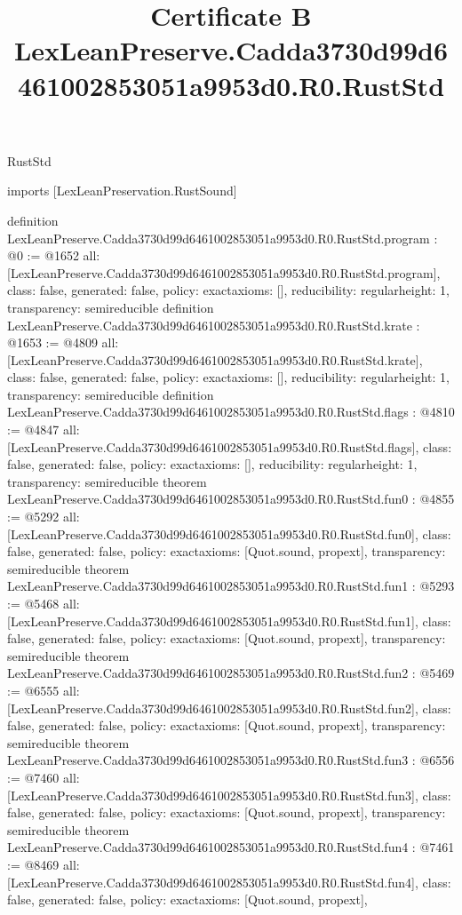 \begin{lexlean}{RustStd}
\title{Certificate B LexLeanPreserve.Cadda3730d99d6461002853051a9953d0.R0.RustStd}
\begin{coremodule}
imports [LexLeanPreservation.RustSound]

definition LexLeanPreserve.Cadda3730d99d6461002853051a9953d0.R0.RustStd.program : @0 := @1652 {
  all: [LexLeanPreserve.Cadda3730d99d6461002853051a9953d0.R0.RustStd.program],
  class: false,
  generated: false,
  policy: exact{axioms: []},
  reducibility: regular{height: 1},
  transparency: semireducible
}
definition LexLeanPreserve.Cadda3730d99d6461002853051a9953d0.R0.RustStd.krate : @1653 := @4809 {
  all: [LexLeanPreserve.Cadda3730d99d6461002853051a9953d0.R0.RustStd.krate],
  class: false,
  generated: false,
  policy: exact{axioms: []},
  reducibility: regular{height: 1},
  transparency: semireducible
}
definition LexLeanPreserve.Cadda3730d99d6461002853051a9953d0.R0.RustStd.flags : @4810 := @4847 {
  all: [LexLeanPreserve.Cadda3730d99d6461002853051a9953d0.R0.RustStd.flags],
  class: false,
  generated: false,
  policy: exact{axioms: []},
  reducibility: regular{height: 1},
  transparency: semireducible
}
theorem LexLeanPreserve.Cadda3730d99d6461002853051a9953d0.R0.RustStd.fun0 : @4855 := @5292 {
  all: [LexLeanPreserve.Cadda3730d99d6461002853051a9953d0.R0.RustStd.fun0],
  class: false,
  generated: false,
  policy: exact{axioms: [Quot.sound, propext]},
  transparency: semireducible
}
theorem LexLeanPreserve.Cadda3730d99d6461002853051a9953d0.R0.RustStd.fun1 : @5293 := @5468 {
  all: [LexLeanPreserve.Cadda3730d99d6461002853051a9953d0.R0.RustStd.fun1],
  class: false,
  generated: false,
  policy: exact{axioms: [Quot.sound, propext]},
  transparency: semireducible
}
theorem LexLeanPreserve.Cadda3730d99d6461002853051a9953d0.R0.RustStd.fun2 : @5469 := @6555 {
  all: [LexLeanPreserve.Cadda3730d99d6461002853051a9953d0.R0.RustStd.fun2],
  class: false,
  generated: false,
  policy: exact{axioms: [Quot.sound, propext]},
  transparency: semireducible
}
theorem LexLeanPreserve.Cadda3730d99d6461002853051a9953d0.R0.RustStd.fun3 : @6556 := @7460 {
  all: [LexLeanPreserve.Cadda3730d99d6461002853051a9953d0.R0.RustStd.fun3],
  class: false,
  generated: false,
  policy: exact{axioms: [Quot.sound, propext]},
  transparency: semireducible
}
theorem LexLeanPreserve.Cadda3730d99d6461002853051a9953d0.R0.RustStd.fun4 : @7461 := @8469 {
  all: [LexLeanPreserve.Cadda3730d99d6461002853051a9953d0.R0.RustStd.fun4],
  class: false,
  generated: false,
  policy: exact{axioms: [Quot.sound, propext]},
}
\end{coremodule}
\end{lexlean}
